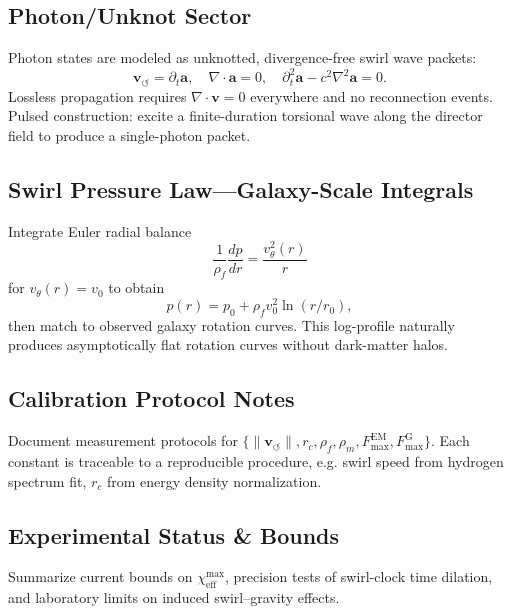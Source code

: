 \documentclass[10pt,reprint,aps,onecolumn,nofootinbib]{revtex4-2}
\begin{document}
\subsection{Photon/Unknot Sector}
\label{canon58:appE}
Photon states are modeled as unknotted, divergence-free swirl wave packets:
\[
    \mathbf{v}_{\!\boldsymbol{\circlearrowleft}} = \partial_t \mathbf{a}, \quad
    \nabla \cdot \mathbf{a} = 0, \quad
    \partial_t^{2}\mathbf{a} - c^{2}\nabla^{2}\mathbf{a} = 0.
\]
Lossless propagation requires $\nabla\cdot\mathbf{v}=0$ everywhere and
no reconnection events. Pulsed construction: excite a finite-duration
torsional wave along the director field to produce a single-photon packet.

\subsection{Swirl Pressure Law—Galaxy-Scale Integrals}
\label{canon58:appF}
Integrate Euler radial balance
\[
    \frac{1}{\rho_{\!f}}\frac{dp}{dr} = \frac{v_{\theta}^{2}(r)}{r}
\]
for $v_\theta(r)=v_0$ to obtain
\[
    p(r) = p_0 + \rho_{\!f} v_0^{2} \ln(r/r_0),
\]
then match to observed galaxy rotation curves. This log-profile naturally
produces asymptotically flat rotation curves without dark-matter halos.

\subsection{Calibration Protocol Notes}
\label{canon58:appG}
Document measurement protocols for
$\{\lVert \mathbf{v}_{\!\boldsymbol{\circlearrowleft}}\rVert, r_c, \rho_{\!f}, \rho_{\!m},
F_{\max}^{\mathrm{EM}}, F_{\max}^{\mathrm{G}}\}$.
Each constant is traceable to a reproducible procedure, e.g.
swirl speed from hydrogen spectrum fit, $r_c$ from energy density normalization.

\subsection{Experimental Status \& Bounds}
\label{canon58:appH}
Summarize current bounds on $\chi_{\mathrm{eff}}^{\max}$,
precision tests of swirl-clock time dilation,
and laboratory limits on induced swirl–gravity effects.
\end{document}
